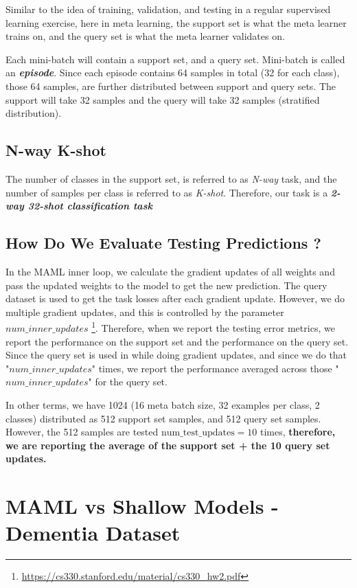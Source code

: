 \documentclass{article}
\begin{document}
\noindent Similar to the idea of training, validation, and testing in a regular supervised learning exercise, here in meta learning, the support set is what the meta learner trains on, and the query set is what the meta learner validates on.

\noindent Each mini-batch will contain a support set, and a query set. Mini-batch is called an \textbf{\textit{episode}}. Since each episode contains 64 samples in total (32 for each class), those 64 samples, are further distributed between support and query sets. The support will take 32 samples and the query will take 32 samples (stratified distribution).

\subsection*{N-way K-shot}
The number of classes in the support set, is referred to as \textit{N-way} task, and the number of samples per class is referred to as \textit{K-shot}. Therefore, our task is a \textit{\textbf{2-way 32-shot classification task}} 


\subsection*{How Do We Evaluate Testing Predictions ?}
In the MAML inner loop, we calculate the gradient updates of all weights and pass the updated weights to the model to get the new prediction. The query dataset is used to get the task losses after each gradient update. However, we do multiple gradient updates, and this is controlled by the parameter $num\_inner\_updates$ \footnote{\url{https://cs330.stanford.edu/material/cs330_hw2.pdf}}. Therefore, when we report the testing error metrics, we report the performance on the support set and the performance on the query set. Since the query set is used in while doing gradient updates, and since we do that "$num\_inner\_updates$" times, we report the performance averaged across those "$num\_inner\_updates$" for the query set. 

 
\noindent In other terms, we have 1024 (16 meta batch size, 32 examples per class, 2 classes) distributed as 512 support set samples, and 512 query set samples. However, the 512 samples are tested $\text{num\_test\_updates} = 10$ times, \textbf{therefore, we are reporting the average of the support set + the 10 query set updates.}


\section{MAML vs Shallow Models - Dementia Dataset}
\end{document}
